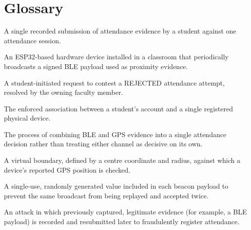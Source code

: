 \documentclass[12pt, a4paper, oneside]{report}
\begin{document}
\fi
\chapter{Glossary}
\label{app:glossary}

\begin{description}[style=multiline, leftmargin=3cm]
\item[Attendance Attempt] A single recorded submission of attendance evidence by a student against one attendance session.
\item[Beacon] An ESP32-based hardware device installed in a classroom that periodically broadcasts a signed BLE payload used as proximity evidence.
\item[Claim] A student-initiated request to contest a REJECTED attendance attempt, resolved by the owning faculty member.
\item[Device Binding] The enforced association between a student's account and a single registered physical device.
\item[Evidence Fusion] The process of combining BLE and GPS evidence into a single attendance decision rather than treating either channel as decisive on its own.
\item[Geofence] A virtual boundary, defined by a centre coordinate and radius, against which a device's reported GPS position is checked.
\item[Nonce] A single-use, randomly generated value included in each beacon payload to prevent the same broadcast from being replayed and accepted twice.
\item[Replay Attack] An attack in which previously captured, legitimate evidence (for example, a BLE payload) is recorded and resubmitted later to fraudulently register attendance.
\end{description}

\fi
\end{document}

